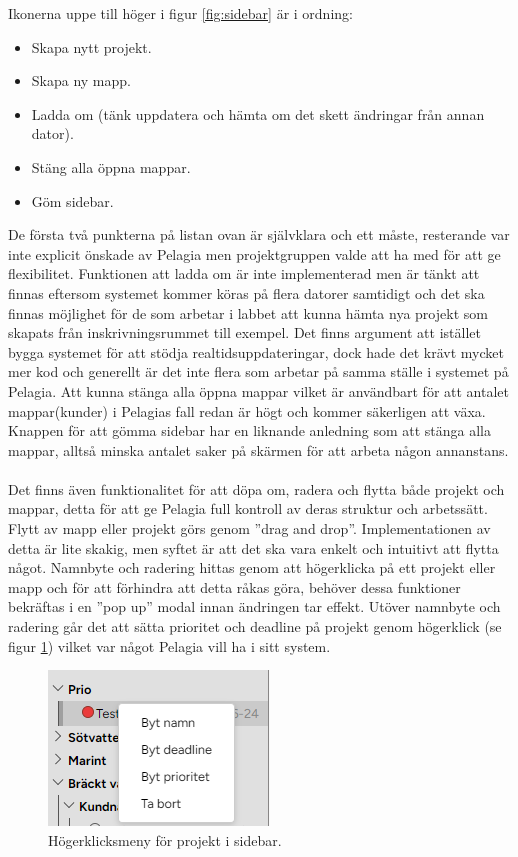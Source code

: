 \noindent Ikonerna uppe till höger i figur \ref{fig:sidebar} är i ordning:
\begin{itemize}
    \item Skapa nytt projekt.
    \item Skapa ny mapp.
    \item Ladda om (tänk uppdatera och hämta om det skett ändringar från annan dator).
    \item Stäng alla öppna mappar.
    \item Göm sidebar.
\end{itemize}

\noindent De första två punkterna på listan ovan är självklara och ett måste, resterande var inte explicit önskade av Pelagia men projektgruppen valde att ha med för att ge flexibilitet.
Funktionen att ladda om är inte implementerad men är tänkt att finnas eftersom systemet kommer köras på flera datorer samtidigt och det ska finnas möjlighet för de som arbetar i labbet att kunna hämta nya projekt som skapats från inskrivningsrummet till exempel.
Det finns argument att istället bygga systemet för att stödja realtidsuppdateringar, dock hade det krävt mycket mer kod och generellt är det inte flera som arbetar på samma ställe i systemet på Pelagia.
Att kunna stänga alla öppna mappar vilket är användbart för att antalet mappar(kunder) i Pelagias fall redan är högt och kommer säkerligen att växa. Knappen för att gömma sidebar har en liknande anledning som att stänga alla mappar, alltså minska antalet saker på skärmen för att arbeta någon annanstans.
\\\\
Det finns även funktionalitet för att döpa om, radera och flytta både projekt och mappar, detta för att ge Pelagia full kontroll av deras struktur och arbetssätt. Flytt av mapp eller projekt görs genom ''drag and drop''. Implementationen av detta är
lite skakig, men syftet är att det ska vara enkelt och intuitivt att flytta något. Namnbyte och radering hittas genom att högerklicka på ett projekt eller mapp och för att förhindra att detta råkas göra, behöver dessa funktioner bekräftas i en ''pop up'' modal innan ändringen tar effekt.
Utöver namnbyte och radering går det att sätta prioritet och deadline på projekt genom högerklick (se figur \ref{fig:sidebar_menu}) vilket var något Pelagia vill ha i sitt system.
\begin{figure}[H]
    \centering
    \includegraphics[width=0.5\linewidth]{images/sidebar_menu.png}
    \caption{Högerklicksmeny för projekt i sidebar.}
    \label{fig:sidebar_menu}
\end{figure}
